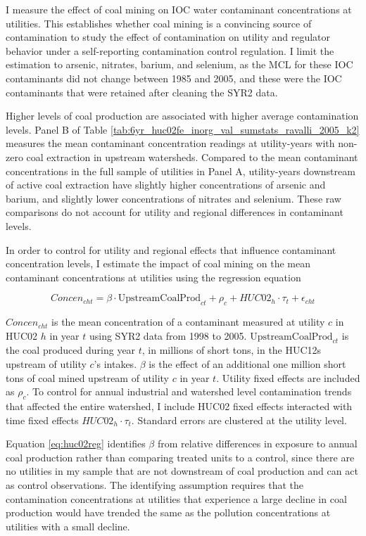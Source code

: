 \documentclass[12pt]{article}
\begin{document}
I measure the effect of coal mining on IOC water contaminant concentrations at utilities. This establishes whether coal mining is a convincing source of contamination to study the effect of contamination on utility and regulator behavior under a self-reporting contamination control regulation. I limit the estimation to arsenic, nitrates, barium, and selenium, as the MCL for these IOC contaminants did not change between 1985 and 2005, and these were the IOC contaminants that were retained after cleaning the SYR2 data.

Higher levels of coal production are associated with higher average contamination levels. Panel B of Table \ref{tab:6yr_huc02fe_inorg_val_sumstats_ravalli_2005_k2} measures the mean contaminant concentration readings at utility-years with non-zero coal extraction in upstream watersheds. Compared to the mean contaminant concentrations in the full sample of utilities in Panel A, utility-years downstream of active coal extraction have slightly higher concentrations of arsenic and barium, and slightly lower concentrations of nitrates and selenium. These raw comparisons do not account for utility and regional differences in contaminant levels.

In order to control for utility and regional effects that influence contaminant concentration levels, I estimate the impact of coal mining on the mean contaminant concentrations at utilities using the regression equation

\begin{equation}\label{eq:huc02reg}
    \textit{Concen}_{cht}= \beta\cdot\text{UpstreamCoalProd}_{ct} + \rho_c + HUC02_h\cdot\tau_t + \epsilon_{cht}
\end{equation}

$\textit{Concen}_{cht}$ is the mean concentration of a contaminant measured at utility $c$ in HUC02 $h$ in year $t$ using SYR2 data from 1998 to 2005. $\text{UpstreamCoalProd}_{ct}$ is the coal produced during year $t$, in millions of short tons, in the HUC12s upstream of utility $c$'s intakes. $\beta$ is the effect of an additional one million short tons of coal mined upstream of utility $c$ in year $t$. Utility fixed effects are included as $\rho_c$. To control for annual industrial and watershed level contamination trends that affected the entire watershed, I include HUC02 fixed effects interacted with time fixed effects $HUC02_h\cdot\tau_t$. Standard errors are clustered at the utility level.

Equation \ref{eq:huc02reg} identifies $\beta$ from relative differences in exposure to annual coal production rather than comparing treated units to a control, since there are no utilities in my sample that are not downstream of coal production and can act as control observations. The identifying assumption requires that the contamination concentrations at utilities that experience a large decline in coal production would have trended the same as the pollution concentrations at utilities with a small decline. %
\end{document}
